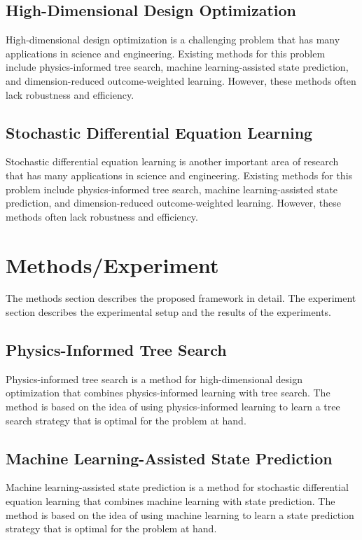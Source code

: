 \documentclass{article}
\begin{document}
\subsection{High-Dimensional Design Optimization}

High-dimensional design optimization is a challenging problem that has many applications in science and engineering. Existing methods for this problem include physics-informed tree search, machine learning-assisted state prediction, and dimension-reduced outcome-weighted learning. However, these methods often lack robustness and efficiency.

\subsection{Stochastic Differential Equation Learning}

Stochastic differential equation learning is another important area of research that has many applications in science and engineering. Existing methods for this problem include physics-informed tree search, machine learning-assisted state prediction, and dimension-reduced outcome-weighted learning. However, these methods often lack robustness and efficiency.

\section{Methods/Experiment}

The methods section describes the proposed framework in detail. The experiment section describes the experimental setup and the results of the experiments.

\subsection{Physics-Informed Tree Search}

Physics-informed tree search is a method for high-dimensional design optimization that combines physics-informed learning with tree search. The method is based on the idea of using physics-informed learning to learn a tree search strategy that is optimal for the problem at hand.

\subsection{Machine Learning-Assisted State Prediction}

Machine learning-assisted state prediction is a method for stochastic differential equation learning that combines machine learning with state prediction. The method is based on the idea of using machine learning to learn a state prediction strategy that is optimal for the problem at hand.
\end{document}
